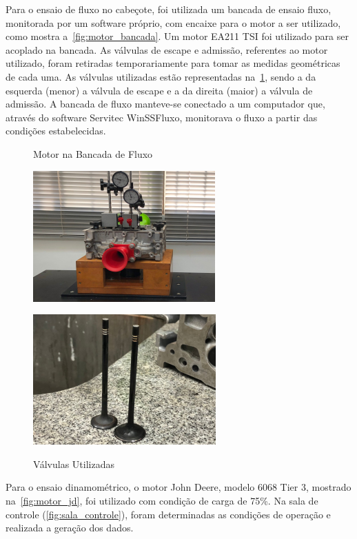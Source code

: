 Para o ensaio de fluxo no cabeçote, foi utilizada um bancada de ensaio fluxo, monitorada por um software próprio, com encaixe para o motor a ser utilizado, como mostra a~\cref{fig:motor_bancada}. 
Um motor EA211 TSI foi utilizado para ser acoplado na bancada.
As válvulas de escape e admissão, referentes ao motor utilizado, foram retiradas temporariamente para tomar as medidas geométricas de cada uma. As válvulas utilizadas estão representadas na~\cref{fig:valvulas}, sendo a da esquerda (menor) a válvula de escape e a da direita (maior) a válvula de admissão.
A bancada de fluxo manteve-se conectado a um computador que, através do software Servitec WinSSFluxo, monitorava o fluxo a partir das condições estabelecidas.
%
\begin{figure}[!htb]
    \centering
    \begin{minipage}[t]{0.49\textwidth}
        \centering
        \caption{Motor na Bancada de Fluxo}
        \includegraphics{figuras/motor_na_bancada.png}
        \label{fig:motor_bancada}
    \end{minipage}
    \hfill
    \begin{minipage}[t]{0.49\textwidth}
        \centering
        \caption{Válvulas Utilizadas} 
        \includegraphics{figuras/valvulas.png}
        \label{fig:valvulas}
    \end{minipage}
\end{figure}
%
Para o ensaio dinamométrico, o motor John Deere, modelo 6068 Tier 3, mostrado na~\cref{fig:motor_jd}, foi utilizado com condição de carga de 75\%. Na sala de controle (\cref{fig:sala_controle}), foram determinadas as condições de operação e realizada a geração dos dados.
